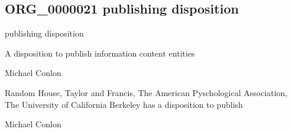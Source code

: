 \documentclass[letterpaper,10pt,english]{sphinxmanual}
\begin{document}
\subsection{ORG\_0000021 \sphinxhyphen{} publishing disposition}
\label{\detokenize{doc-ORG_0000021:org-0000021-publishing-disposition}}\label{\detokenize{doc-ORG_0000021:index-0}}\label{\detokenize{doc-ORG_0000021::doc}}
\begin{sphinxShadowBox}

\sphinxAtStartPar
publishing disposition
\end{sphinxShadowBox}

\begin{sphinxShadowBox}

\sphinxAtStartPar
{\hyperref[\detokenize{doc-BFO_0000016::doc}]{}}
\end{sphinxShadowBox}

\begin{sphinxShadowBox}

\sphinxAtStartPar
A disposition to publish information content entities
\end{sphinxShadowBox}

\begin{sphinxShadowBox}

\sphinxAtStartPar
Michael Conlon 
\end{sphinxShadowBox}

\begin{sphinxShadowBox}

\sphinxAtStartPar
Random House, Taylor and Francis, The American Pyschological Association, The University of California Berkeley has a disposition to publish
\end{sphinxShadowBox}

\begin{sphinxShadowBox}

\sphinxAtStartPar
Michael Conlon 
\end{sphinxShadowBox}
\begin{quote}

\ignorespaces \end{quote}
\end{document}
